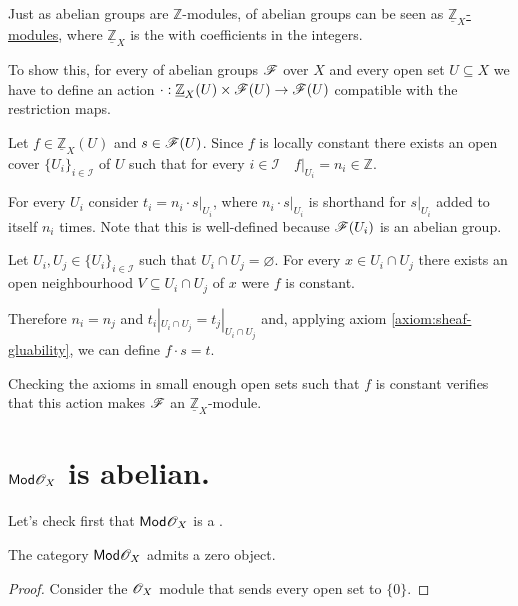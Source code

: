 \documentclass[../main.tex]{subfiles}
\begin{document}
Just as abelian groups are \(\mathbb{Z}\)-modules,  of abelian groups can be seen as \href{def:ox-mod}{\(\underline{\mathbb{Z}}_{X}\)-modules}, where \(\underline{\mathbb{Z}}_{X}\) is the  with coefficients in the integers.

To show this, for every  of abelian groups \(\mathscr{F}\) over \(X\) and every open set \(U \subseteq X\) we have to define an action \(\cdot: \underline{\mathbb{Z}}_{X}(U) \times \mathscr{F}(U) \to \mathscr{F}(U)\) compatible with the restriction maps.

Let \(f \in \underline{\mathbb{Z}}_{X}(U)\) and \(s \in \mathscr{F}(U)\).
Since \(f\) is locally constant there exists an open cover \(\{U_{i}\}_{i \in \mathcal{I}}\) of \(U\) such that for every \(i \in \mathcal{I} \quad f|_{U_{i}} = n_{i} \in \mathbb{Z}\).

For every \(U_{i}\) consider \(t_{i} = n_{i} \cdot s|_{U_{i}}\), where \(n_{i} \cdot s|_{U_{i}}\) is shorthand for \(s|_{U_{i}}\) added to itself \(n_{i}\) times.
Note that this is well-defined because \(\mathscr{F}(U_{i})\) is an abelian group.

Let \(U_{i}, U_{j} \in \{U_{i}\}_{i \in \mathcal{I}}\) such that \(U_{i} \cap U_{j} = \varnothing\).
For every \(x \in U_{i} \cap U_{j}\) there exists an open neighbourhood \(V \subseteq U_{i} \cap U_{j}\) of \(x\) were \(f\) is constant.

Therefore \(n_{i} = n_{j}\) and \(t_{i}|_{U_{i} \cap U_{j}} = t_{j}|_{U_{i} \cap U_{j}}\) and, applying axiom \ref{axiom:sheaf-gluability}, we can define \(f \cdot s = t\).

Checking the axioms in small enough open sets such that \(f\) is constant verifies that this action makes \(\mathscr{F}\) an \(\underline{\mathbb{Z}}_{X}\)-module.

\section{\(\mathsf{Mod}{\mathscr{O}_{X}}\) is abelian.}

Let's check first that \(\mathsf{Mod}{\mathscr{O}_{X}}\) is a .
\begin{lemma}
  The category \(\mathsf{Mod}{\mathscr{O}_{X}}\) admits a zero object.
\end{lemma}
\begin{proof}
  Consider the \(\mathscr{O}_{X}\) module that sends every open set to \(\{0\}\).
\end{proof}
\end{document}
